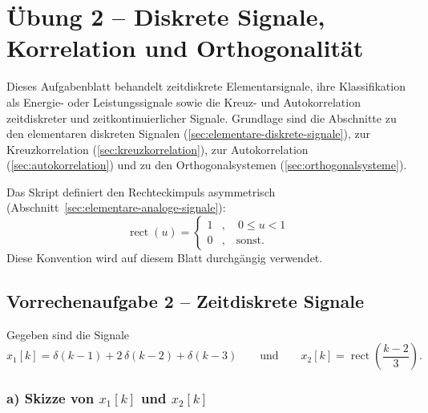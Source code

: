\section{Übung 2 – Diskrete Signale, Korrelation und Orthogonalität}

Dieses Aufgabenblatt behandelt zeitdiskrete Elementarsignale, ihre
Klassifikation als Energie- oder Leistungssignale sowie die Kreuz- und
Autokorrelation zeit\-diskreter und zeitkontinuierlicher Signale. Grundlage
sind die Abschnitte zu den elementaren diskreten Signalen
(\ref{sec:elementare-diskrete-signale}), zur Kreuzkorrelation
(\ref{sec:kreuzkorrelation}), zur Autokorrelation
(\ref{sec:autokorrelation}) und zu den Orthogonalsystemen
(\ref{sec:orthogonalsysteme}).

\begin{bemerkung}
Das Skript definiert den Rechteckimpuls asymmetrisch (Abschnitt~\ref{sec:elementare-analoge-signale}):
$$
\operatorname{rect}(u) = \begin{cases} 1 & , \quad 0 \leq u < 1 \\ 0 & , \quad \text{sonst.} \end{cases}
$$
Diese Konvention wird auf diesem Blatt durchgängig verwendet.
\end{bemerkung}

\subsection*{Vorrechenaufgabe 2 – Zeitdiskrete Signale}

Gegeben sind die Signale
$$
x_1[k] = \delta(k-1) + 2\,\delta(k-2) + \delta(k-3)
\qquad\text{und}\qquad
x_2[k] = \operatorname{rect}\!\left(\frac{k-2}{3}\right).
$$

\subsubsection*{a) Skizze von $x_1[k]$ und $x_2[k]$}

